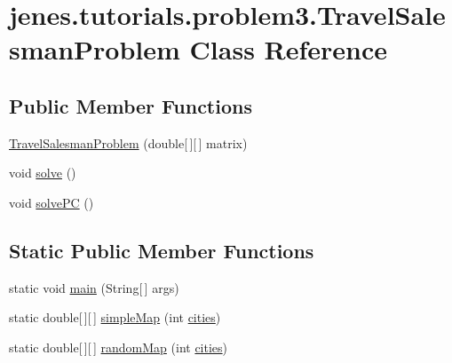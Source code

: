 \hypertarget{classjenes_1_1tutorials_1_1problem3_1_1_travel_salesman_problem}{\section{jenes.\-tutorials.\-problem3.\-Travel\-Salesman\-Problem Class Reference}
\label{classjenes_1_1tutorials_1_1problem3_1_1_travel_salesman_problem}
}
\subsection*{Public Member Functions}
\begin{DoxyCompactItemize}
\item 
\hyperlink{classjenes_1_1tutorials_1_1problem3_1_1_travel_salesman_problem_a6a5b57b4c96b1cd6367be99ff5542b0d}{Travel\-Salesman\-Problem} (double\mbox{[}$\,$\mbox{]}\mbox{[}$\,$\mbox{]} matrix)
\item 
void \hyperlink{classjenes_1_1tutorials_1_1problem3_1_1_travel_salesman_problem_ac2507cd4e4fecd4a68fa76dee8ee40e1}{solve} ()
\item 
void \hyperlink{classjenes_1_1tutorials_1_1problem3_1_1_travel_salesman_problem_a6f115876612aecf1c22058ebc96f21d8}{solve\-P\-C} ()
\end{DoxyCompactItemize}
\subsection*{Static Public Member Functions}
\begin{DoxyCompactItemize}
\item 
static void \hyperlink{classjenes_1_1tutorials_1_1problem3_1_1_travel_salesman_problem_a2ca005fbeba6c5fdf1406aed8ebd6b56}{main} (String\mbox{[}$\,$\mbox{]} args)
\item 
static double\mbox{[}$\,$\mbox{]}\mbox{[}$\,$\mbox{]} \hyperlink{classjenes_1_1tutorials_1_1problem3_1_1_travel_salesman_problem_a5101bfe709c445cb0dacc93024979082}{simple\-Map} (int \hyperlink{classjenes_1_1tutorials_1_1problem3_1_1_travel_salesman_problem_af256e6139f6148cb3d585c54684321a1}{cities})
\item 
static double\mbox{[}$\,$\mbox{]}\mbox{[}$\,$\mbox{]} \hyperlink{classjenes_1_1tutorials_1_1problem3_1_1_travel_salesman_problem_aaac8cbd0414b02891c9572b3e07c2637}{random\-Map} (int \hyperlink{classjenes_1_1tutorials_1_1problem3_1_1_travel_salesman_problem_af256e6139f6148cb3d585c54684321a1}{cities})
\end{DoxyCompactItemize}
